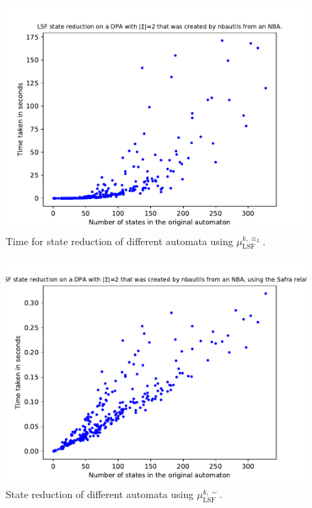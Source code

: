 \begin{figure}
\begin{minipage}{0.49\textwidth}
		\includegraphics[page=1,height=.3\textheight]{../data/analysis/lsf/detnbaut_ap1.pdf} 
		\caption{Time for state reduction of different automata using $\mu_\text{LSF}^{k,\equiv_L}$.}
		\label{fig:lsf:empirical_time}
	\end{minipage}
\end{figure}

\begin{figure}
	\centering
	\includegraphics[page=6,height=.4\textheight]{../data/analysis/lsf/detnbaut_safra_ap1.pdf} 
	\caption{State reduction of different automata using $\mu_\text{LSF}^{k,\sim}$.}
	\label{fig:lsf:empirical_safra_size_hist}
\end{figure}

